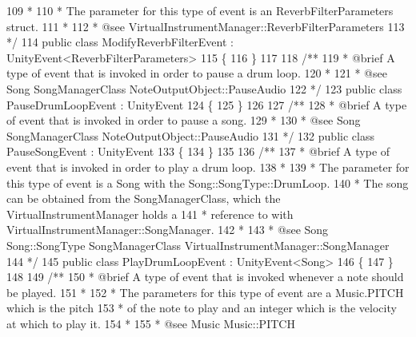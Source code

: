 \begin{DoxyCodeInclude}
109 \textcolor{comment}{     * }
110 \textcolor{comment}{     * The parameter for this type of event is an ReverbFilterParameters struct.}
111 \textcolor{comment}{     *  }
112 \textcolor{comment}{     * @see VirtualInstrumentManager::ReverbFilterParameters}
113 \textcolor{comment}{    */}
114     \textcolor{keyword}{public} \textcolor{keyword}{class }ModifyReverbFilterEvent : UnityEvent<ReverbFilterParameters>
115     \{
116     \}
117 \textcolor{comment}{}
118 \textcolor{comment}{    /** }
119 \textcolor{comment}{     * @brief A type of event that is invoked in order to pause a drum loop.}
120 \textcolor{comment}{     *  }
121 \textcolor{comment}{     * @see Song SongManagerClass NoteOutputObject::PauseAudio}
122 \textcolor{comment}{    */}
123     \textcolor{keyword}{public} \textcolor{keyword}{class }PauseDrumLoopEvent : UnityEvent
124     \{
125     \}
126 \textcolor{comment}{}
127 \textcolor{comment}{    /** }
128 \textcolor{comment}{     * @brief A type of event that is invoked in order to pause a song.}
129 \textcolor{comment}{     *  }
130 \textcolor{comment}{     * @see Song SongManagerClass NoteOutputObject::PauseAudio}
131 \textcolor{comment}{    */}
132     \textcolor{keyword}{public} \textcolor{keyword}{class }PauseSongEvent : UnityEvent
133     \{
134     \}
135 \textcolor{comment}{}
136 \textcolor{comment}{    /** }
137 \textcolor{comment}{     * @brief A type of event that is invoked in order to play a drum loop.}
138 \textcolor{comment}{     * }
139 \textcolor{comment}{     * The parameter for this type of event is a Song with the Song::SongType::DrumLoop. }
140 \textcolor{comment}{     * The song can be obtained from the SongManagerClass, which the VirtualInstrumentManager holds a}
141 \textcolor{comment}{     * reference to with VirtualInstrumentManager::SongManager.}
142 \textcolor{comment}{     *  }
143 \textcolor{comment}{     * @see Song Song::SongType SongManagerClass VirtualInstrumentManager::SongManager}
144 \textcolor{comment}{    */}
145     \textcolor{keyword}{public} \textcolor{keyword}{class }PlayDrumLoopEvent : UnityEvent<Song>
146     \{
147     \}
148 \textcolor{comment}{}
149 \textcolor{comment}{    /**}
150 \textcolor{comment}{     * @brief A type of event that is invoked whenever a note should be played. }
151 \textcolor{comment}{     * }
152 \textcolor{comment}{     * The parameters for this type of event are a Music.PITCH which is the pitch}
153 \textcolor{comment}{     * of the note to play and an integer which is the velocity at which to play it.}
154 \textcolor{comment}{     * }
155 \textcolor{comment}{     * @see Music Music::PITCH}

\end{DoxyCodeInclude}
